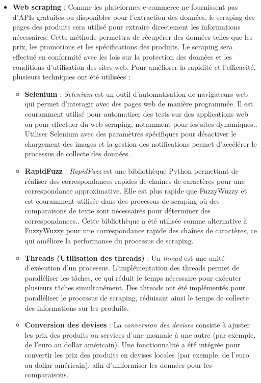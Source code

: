 \documentclass[a4paper, 12pt, oneside]{report}
\begin{document}
\begin{itemize}
    \item \textbf{Web scraping} : Comme les plateformes e-commerce ne fournissent pas d'APIs gratuites ou disponibles pour l'extraction des données, le scraping des pages des produits sera utilisé pour extraire directement les informations nécessaires. Cette méthode permettra de récupérer des données telles que les prix, les promotions et les spécifications des produits. Le scraping sera effectué en conformité avec les lois sur la protection des données et les conditions d'utilisation des sites web. Pour améliorer la rapidité et l'efficacité, plusieurs techniques ont été utilisées :
    \begin{itemize}
        \item \textbf{Selenium} : \textit{Selenium} est un outil d'automatisation de navigateurs web qui permet d'interagir avec des pages web de manière programmée. Il est couramment utilisé pour automatiser des tests sur des applications web ou pour effectuer du web scraping, notamment pour les sites dynamiques.\cite{SeleniumSource}. Utiliser Selenium avec des paramètres spécifiques pour désactiver le chargement des images et la gestion des notifications permet d'accélérer le processus de collecte des données.
    
    \item \textbf{RapidFuzz} : \textit{RapidFuzz} est une bibliothèque Python permettant de réaliser des correspondances rapides de chaînes de caractères pour une correspondance approximative. Elle est plus rapide que FuzzyWuzzy et est couramment utilisée dans des processus de scraping où des comparaisons de texte sont nécessaires pour déterminer des correspondances.\cite{RapidfuzzSource}. Cette bibliothèque a été utilisée comme alternative à FuzzyWuzzy pour une correspondance rapide des chaînes de caractères, ce qui améliore la performance du processus de scraping.
    
    \item \textbf{Threads (Utilisation des threads)} : Un \textit{thread} est une unité d'exécution d'un processus. L'implémentation des threads permet de paralléliser les tâches, ce qui réduit le temps nécessaire pour exécuter plusieurs tâches simultanément. Des threads ont été implémentés pour paralléliser le processus de scraping, réduisant ainsi le temps de collecte des informations sur les produits.
    
    \item \textbf{Conversion des devises} : La \textit{conversion des devises} consiste à ajuster les prix des produits ou services d'une monnaie à une autre (par exemple, de l'euro au dollar américain). Une fonctionnalité a été intégrée pour convertir les prix des produits en devises locales (par exemple, de l'euro au dollar américain), afin d’uniformiser les données pour les comparaisons.
    

\end{itemize}
\end{itemize}
\end{document}
